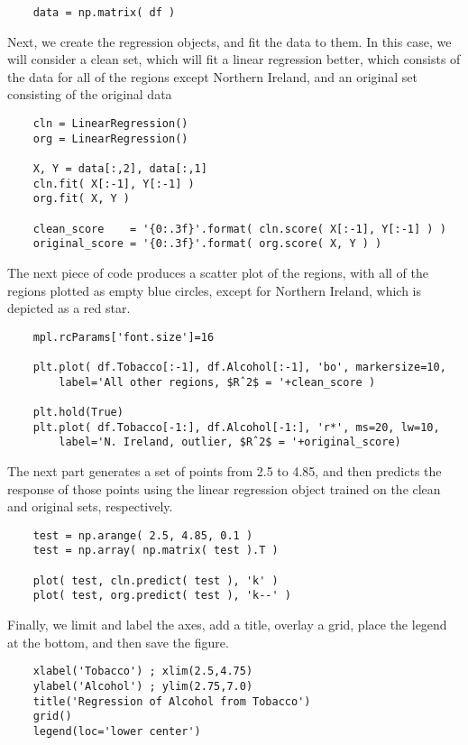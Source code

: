 \begin{lstlisting}	
    data = np.matrix( df )
\end{lstlisting}

Next, we create the regression objects, and fit the data to them. In this case, we will consider a clean set, which will fit a linear regression better, which consists of the data for all of the regions except Northern Ireland, and an original set consisting of the original data

\begin{lstlisting}	
    cln = LinearRegression()
    org = LinearRegression()

    X, Y = data[:,2], data[:,1]
    cln.fit( X[:-1], Y[:-1] )
    org.fit( X, Y )

    clean_score    = '{0:.3f}'.format( cln.score( X[:-1], Y[:-1] ) )
    original_score = '{0:.3f}'.format( org.score( X, Y ) )
\end{lstlisting}

The next piece of code produces a scatter plot of the regions, with all of the regions plotted as empty blue circles, except for Northern Ireland, which is depicted as a red star.

\begin{lstlisting}
    mpl.rcParams['font.size']=16

    plt.plot( df.Tobacco[:-1], df.Alcohol[:-1], 'bo', markersize=10,
        label='All other regions, $Rˆ2$ = '+clean_score )

    plt.hold(True)
    plt.plot( df.Tobacco[-1:], df.Alcohol[-1:], 'r*', ms=20, lw=10,
        label='N. Ireland, outlier, $Rˆ2$ = '+original_score)
\end{lstlisting}

The next part generates a set of points from 2.5 to 4.85, and then predicts the response of those points using the linear regression object trained on the clean and original sets, respectively.

\begin{lstlisting}
    test = np.arange( 2.5, 4.85, 0.1 )
    test = np.array( np.matrix( test ).T )

    plot( test, cln.predict( test ), 'k' )
    plot( test, org.predict( test ), 'k--' )
\end{lstlisting}

Finally, we limit and label the axes, add a title, overlay a grid, place the legend at the bottom, and then save the figure.

\begin{lstlisting}
    xlabel('Tobacco') ; xlim(2.5,4.75)
    ylabel('Alcohol') ; ylim(2.75,7.0)
    title('Regression of Alcohol from Tobacco')
    grid()
    legend(loc='lower center')
\end{lstlisting}

